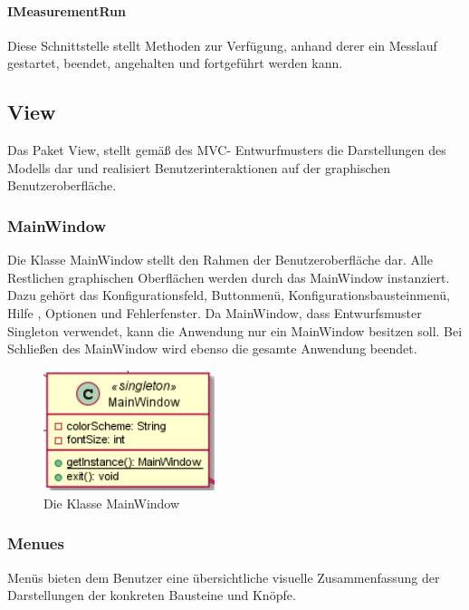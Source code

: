 \documentclass[parskip=full]{scrartcl}
\begin{document}
\paragraph{IMeasurementRun}

Diese Schnittstelle stellt Methoden zur Verfügung, anhand derer ein Messlauf gestartet, beendet, angehalten und fortgeführt werden kann.

\clearpage
\subsection{View}
Das Paket View, stellt gemäß des MVC- Entwurfmusters die Darstellungen des Modells dar und realisiert Benutzerinteraktionen auf der graphischen Benutzeroberfläche. 

\subsubsection{MainWindow} 
Die Klasse MainWindow stellt den Rahmen der Benutzeroberfläche dar. Alle Restlichen graphischen Oberflächen werden durch das MainWindow instanziert. Dazu gehört das Konfigurationsfeld, Buttonmenü, Konfigurationsbausteinmenü, Hilfe , Optionen und Fehlerfenster. 
Da MainWindow, dass Entwurfsmuster Singleton verwendet, kann die Anwendung nur ein MainWindow besitzen soll.
Bei Schließen des MainWindow wird ebenso die gesamte Anwendung beendet.

\begin{figure}[htbp]
	\begin{center}
		\includegraphics[width = 5cm]{Grafiken/View/MainWindow.png}
		\caption{Die Klasse MainWindow}
		\label{Entwurf_Grob}
	\end{center}
\end{figure}

\newpage

\subsubsection{Menues}

Menüs bieten dem Benutzer eine übersichtliche visuelle Zusammenfassung der Darstellungen der konkreten Bausteine und Knöpfe. 
\end{document}
